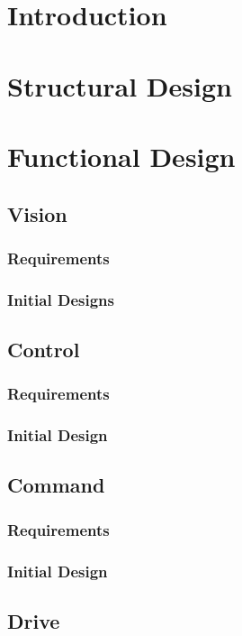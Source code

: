 \documentclass[a4paper]{article}
\begin{document}
\newpage

\section{Introduction}

\section{Structural Design}

\section{Functional Design}

\subsection{Vision}
\subsubsection{Requirements}
\subsubsection{Initial Designs}

\subsection{Control}
\subsubsection{Requirements}
\subsubsection{Initial Design}

\subsection{Command}
\subsubsection{Requirements}
\subsubsection{Initial Design}

\subsection{Drive}
\end{document}

